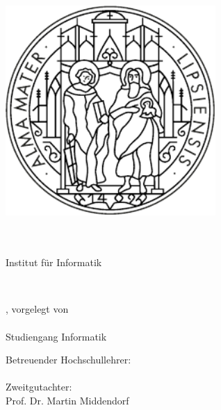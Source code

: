 \begin{titlepage}
    \begin{addmargin}[-1cm]{-3cm}
    \begin{center}
        \large

        \hfill


        \includegraphics[width=8cm]{gfx/uni_leipzig_logo} \\ \medskip

        \myUni \\
        \myFaculty \\
        Institut für Informatik \\ \medskip

        \begingroup
            \color{CTtitle}\spacedallcaps{\myTitle} \\ \bigskip
        \endgroup

        \spacedlowsmallcaps{\mySubtitle}

        \vfill

        \myLocation, \myTime%
        \hfill 
        vorgelegt von\\\hfill
        \myName\\\hfill
        Studiengang Informatik
        
        \vfill
        Betreuender Hochschullehrer:\\\smallskip
        \myProf \\\medskip
        Zweitgutachter:\\\smallskip
        Prof. Dr. Martin Middendorf





    \end{center}
  \end{addmargin}
\end{titlepage}
